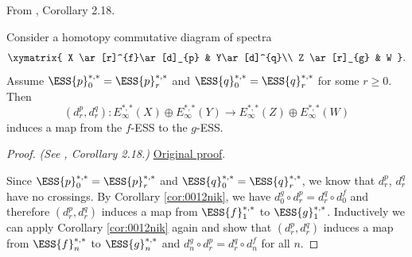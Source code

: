 \begin{corollary}
\label{paper:2.18}
From \cite{LWX126}, Corollary 2.18.\par
\label{cor:e7b20ae2}
    Consider a homotopy commutative diagram of spectra
    $$\xymatrix{
    X \ar[r]^{f}\ar[d]_{p} & Y\ar[d]^{q}\\
    Z \ar[r]_{g} & W
    }.$$
    Assume $\ESS{p}_0^{*,*}=\ESS{p}_r^{*,*}$ and $\ESS{q}_0^{*,*}=\ESS{q}_r^{*,*}$ for some $r\ge 0$. Then 
    $$(d^p_r, d^q_r): E_\infty^{*,*}(X)\oplus E_\infty^{*,*}(Y)\to E_\infty^{*,*}(Z)\oplus E_\infty^{*,*}(W)$$
    induces a map from the $f$-ESS to the $g$-ESS.

\end{corollary}
\begin{proof}
\textit{(See \cite{LWX126}, Corollary 2.18.)} \href{paper/main.tex.html#L628}{Original proof}.

Since $\ESS{p}_0^{*,*}=\ESS{p}_r^{*,*}$ and $\ESS{q}_0^{*,*}=\ESS{q}_r^{*,*}$, we know that $d^p_r$, $d^q_r$ have no crossings. By Corollary \ref{cor:0012nik}, we have $d^g_0\circ d^p_r = d^q_r\circ d^f_0$ and therefore $(d^p_r, d^q_r)$ induces a map from $\ESS{f}_1^{*,*}$ to $\ESS{g}_1^{*,*}$. Inductively we can apply Corollary \ref{cor:0012nik} again and show that $(d^p_r, d^q_r)$ induces a map from $\ESS{f}_n^{*,*}$ to $\ESS{g}_n^{*,*}$ and $d^g_n\circ d^p_r = d^q_r\circ d^f_n$ for all $n$.
\end{proof}

